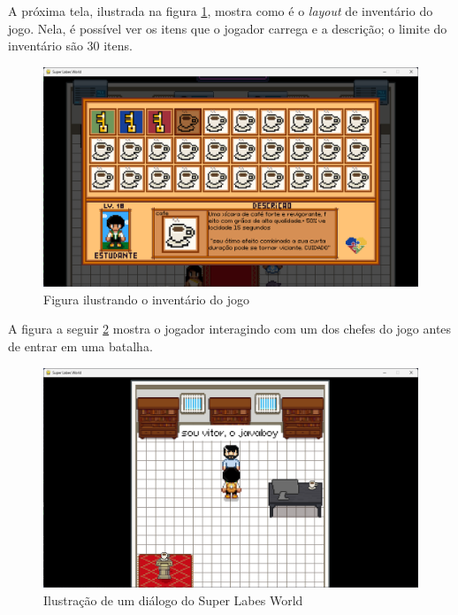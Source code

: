  \newpage
 
A próxima tela, ilustrada na figura \ref{fig:inventory}, mostra como é o \textit{layout} de inventário do jogo. Nela, é possível ver os itens que o jogador carrega e a descrição; o limite do inventário são 30 itens. 
 
\begin{figure}[h!]
    \centering
    \includegraphics[width=1\linewidth]{figuras/inventory.png}
    \caption{Figura ilustrando o inventário do jogo}
    \label{fig:inventory}
\end{figure}

\clearpage
A figura a seguir \ref{fig:dialog} mostra o jogador interagindo com um dos chefes do jogo antes de entrar em uma batalha.

\begin{figure}[h!]
    \centering
    \includegraphics[width=1\linewidth]{figuras/dialog.png}
    \caption{Ilustração de um diálogo do Super Labes World}
    \label{fig:dialog}
\end{figure}

\clearpage

